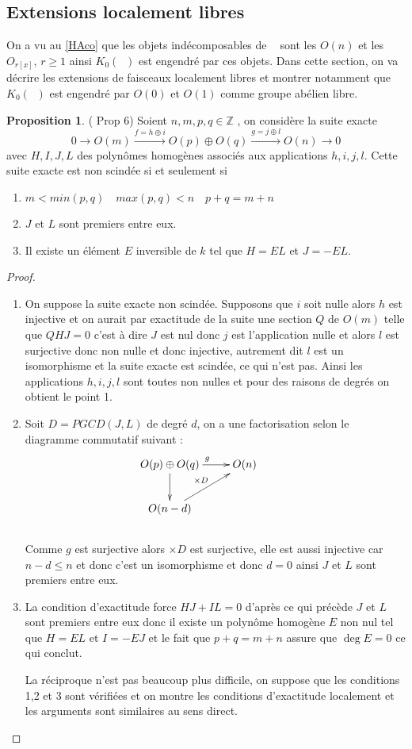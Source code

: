 \documentclass[12pt]{article}
\DeclareMathOperator{\coh}{Coh(\mathbb{P}_{k}^{1})}
\theoremstyle{definition}
\newtheorem{Prop}{Proposition}[section]
\begin{document}
\subsection{Extensions localement libres}\label{extlf}
On a vu au \ref{HAco} que les objets indécomposables de $\coh$ sont les $O(n)$ et les $O_{r[x]}$, $r\geq 1$ ainsi $K_0(\coh)$ est engendré par ces objets. Dans cette section, on va décrire les extensions de faisceaux localement libres et montrer notamment que $ K_0(\coh)$ est engendré par $O(0)$ et $O(1)$ comme groupe abélien libre. \begin{Prop}\label{Extf}(\cite{Baum} Prop 6) Soient $n,m,p,q\in\mathbb{Z}$ , on considère la suite exacte $$0\longrightarrow O(m)\overset{f=h\oplus i}{\longrightarrow} O(p)\oplus O(q)\overset{g=j\oplus l}{\longrightarrow} O(n)\longrightarrow 0$$ avec $H,I,J,L$ des polynômes homogènes associés aux applications $h,i,j,l$. Cette suite exacte est non scindée si et seulement si \begin{enumerate}
\item $m<min(p,q)\quad max(p,q)<n\quad p+q=m+n$\\
\item $J$ et $L$ sont premiers entre eux.\\
\item Il existe un élément $E$ inversible de $k$ tel que $H=EL$ et $J=-EL$.
\end{enumerate}  \end{Prop} 
\begin{proof}
\begin{enumerate}
\item On suppose la suite exacte non scindée. Supposons que $i$ soit nulle alors $h$ est injective et on aurait par exactitude de la suite une section $Q$ de $O(m)$ telle  que $QHJ=0$ c'est à dire $J$ est nul donc $j$ est l'application nulle et alors $l$ est surjective donc non nulle et donc injective, autrement dit $l$ est un isomorphisme et la suite exacte est scindée, ce qui n'est pas. Ainsi les applications $h,i,j,l$ sont toutes non nulles et pour des raisons de degrés on obtient le point 1.
\item Soit $D=PGCD(J,L)$ de degré $d$, on a une factorisation selon le diagramme commutatif suivant  : $$\xymatrix{
    \ar[d] O(p)\oplus O(q) \ar[r]^{g}   & O(n) &  \\
    O(n-d)\ar[ru]^{\times D} &
  }$$\\ Comme $g$ est surjective alors $\times D$ est surjective, elle est aussi injective car $n-d\leqslant n$ et donc c'est un isomorphisme et donc $d=0$ ainsi $J$ et $L$  sont premiers entre eux.
  \item La condition d'exactitude force $HJ+IL=0$ d'après ce qui précède $J$ et $L$ sont premiers entre eux donc il existe un polynôme homogène $E$ non nul tel que $H=EL$ et $I=-EJ$ et le fait que $p+q=m+n$ assure que $\deg E=0$ ce qui conclut.
 
La réciproque n'est pas beaucoup plus difficile, on suppose que les conditions 1,2 et 3 sont vérifiées et on montre les conditions d'exactitude localement et les arguments sont similaires au sens direct.
\end{enumerate}
\end{proof}
\end{document}

